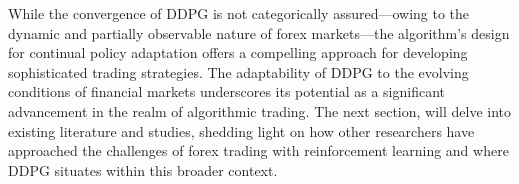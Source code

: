 While the convergence of DDPG is not categorically assured—owing to the dynamic and partially observable nature of forex markets—the algorithm's design for continual policy adaptation offers a compelling approach for developing sophisticated trading strategies. The adaptability of DDPG to the evolving conditions of financial markets underscores its potential as a significant advancement in the realm of algorithmic trading. The next section, will delve into existing literature and studies, shedding light on how other researchers have approached the challenges of forex trading with reinforcement learning and where DDPG situates within this broader context.
